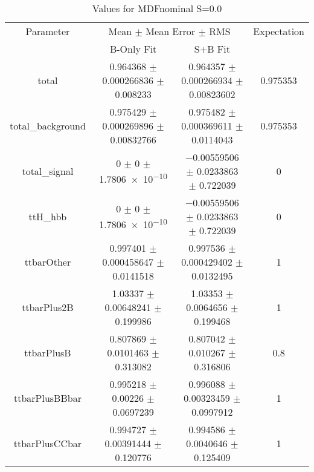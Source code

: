 \begin{table}
\centering
\caption{Values for MDFnominal S=0.0}
\begin{tabular}{cccc}
\toprule
Parameter & \multicolumn{2}{c}{Mean $\pm$ Mean Error $\pm$ RMS} & Expectation\\
 & B-Only Fit & S+B Fit & \\
\midrule
total & \num{0.964368} $\pm$ \num{0.000266836} $\pm$ \num{0.008233} & \num{0.964357} $\pm$ \num{0.000266934} $\pm$ \num{0.00823602} & \num{0.975353}\\
total\_background & \num{0.975429} $\pm$ \num{0.000269896} $\pm$ \num{0.00832766} & \num{0.975482} $\pm$ \num{0.000369611} $\pm$ \num{0.0114043} & \num{0.975353}\\
total\_signal & \num{0} $\pm$ \num{0} $\pm$ \num{1.7806e-10} & \num{-0.00559506} $\pm$ \num{0.0233863} $\pm$ \num{0.722039} & \num{0}\\
ttH\_hbb & \num{0} $\pm$ \num{0} $\pm$ \num{1.7806e-10} & \num{-0.00559506} $\pm$ \num{0.0233863} $\pm$ \num{0.722039} & \num{0}\\
ttbarOther & \num{0.997401} $\pm$ \num{0.000458647} $\pm$ \num{0.0141518} & \num{0.997536} $\pm$ \num{0.000429402} $\pm$ \num{0.0132495} & \num{1}\\
ttbarPlus2B & \num{1.03337} $\pm$ \num{0.00648241} $\pm$ \num{0.199986} & \num{1.03353} $\pm$ \num{0.0064656} $\pm$ \num{0.199468} & \num{1}\\
ttbarPlusB & \num{0.807869} $\pm$ \num{0.0101463} $\pm$ \num{0.313082} & \num{0.807042} $\pm$ \num{0.010267} $\pm$ \num{0.316806} & \num{0.8}\\
ttbarPlusBBbar & \num{0.995218} $\pm$ \num{0.00226} $\pm$ \num{0.0697239} & \num{0.996088} $\pm$ \num{0.00323459} $\pm$ \num{0.0997912} & \num{1}\\
ttbarPlusCCbar & \num{0.994727} $\pm$ \num{0.00391444} $\pm$ \num{0.120776} & \num{0.994586} $\pm$ \num{0.0040646} $\pm$ \num{0.125409} & \num{1}\\
\bottomrule
\end{tabular}
\end{table}